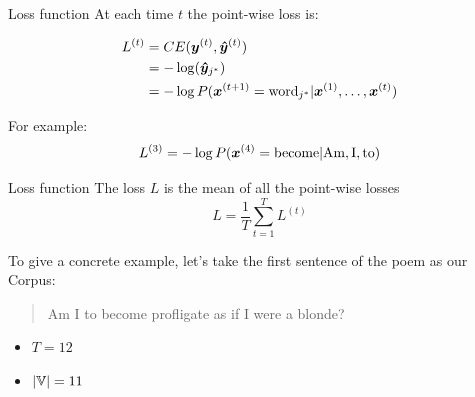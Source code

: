 \documentclass[10pt]{beamer}
\begin{document}
\begin{frame}{Loss function}
At each time $t$ the point-wise loss is:

\vspace{0.2cm}

\begin{align*}
L^{(t)} &= CE(\bm{y}^{(t)},\bm{\hat{y}}^{(t)})\\
		&= - \log(\bm{\hat{y}}_{j^{*}})\\
        &= - \log P(\bm{x}^{(t+1)} = \text{word}_{j^{*}}|\bm{x}^{(1)}, \dots, \bm{x}^{(t)})
\end{align*}

 \vspace{0.2cm}

For example:
\begin{equation*}
L^{(3)}=- \log P(\bm{x}^{(4)} = \text{become}| \text{Am}, \text{I}, \text{to})
\end{equation*}
\end{frame}


\begin{frame}{Loss function}
The loss $L$ is the mean of all the point-wise losses
\begin{equation*}
L=\frac{1}{T}\sum_{t=1}^{T}L^{(t)}
\end{equation*}

To give a concrete example, let's take the first sentence of the poem as our Corpus:\\
\begin{quote}
\alert{Am I to become profligate as if I were a blonde?}
\end{quote}

\begin{itemize}
\item $T = 12$
\item $|\mathbb{V}| = 11$
\end{itemize}

\end{frame}
\end{document}
